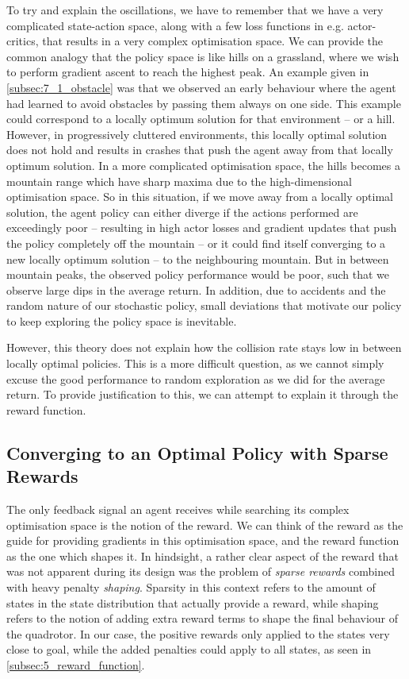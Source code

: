 To try and explain the oscillations, we have to remember that we have a very complicated state-action space, along with a few loss functions in e.g. actor-critics, that results in a very complex optimisation space. We can provide the common analogy that the policy space is like hills on a grassland, where we wish to perform gradient ascent to reach the highest peak. An example given in \cref{subsec:7_1_obstacle} was that we observed an early behaviour where the agent had learned to avoid obstacles by passing them always on one side. This example could correspond to a locally optimum solution for that environment -- or a hill.  
However, in progressively cluttered environments, this locally optimal solution does not hold and results in crashes that push the agent away from that locally optimum solution. In a more complicated optimisation space, the hills becomes a mountain range which have sharp maxima due to the high-dimensional optimisation space. So in this situation, if we move away from a locally optimal solution, the agent policy can either diverge if the actions performed are exceedingly poor -- resulting in high actor losses and gradient updates that push the policy completely off the mountain -- or it could find itself converging to a new locally optimum solution -- to the neighbouring mountain. But in between mountain peaks, the observed policy performance would be poor, such that we observe large dips in the average return. In addition, due to accidents and the random nature of our stochastic policy, small deviations that motivate our policy to keep exploring the policy space is inevitable.

However, this theory does not explain how the collision rate stays low in between locally optimal policies. This is a more difficult question, as we cannot simply excuse the good performance to random exploration as we did for the average return. To provide justification to this, we can attempt to explain it through the reward function.


\subsection{Converging to an Optimal Policy with Sparse Rewards}
\label{subsec:9_sparse_rewards}
The only feedback signal an agent receives while searching its complex optimisation space is the notion of the reward. We can think of the reward as the guide for providing gradients in this optimisation space, and the reward function as the one which shapes it. In hindsight, a rather clear aspect of the reward that was not apparent during its design was the problem of \textit{sparse rewards} combined with heavy penalty \textit{shaping}. Sparsity in this context refers to the amount of states in the state distribution that actually provide a reward, while shaping refers to the notion of adding extra reward terms to shape the final behaviour of the quadrotor.
In our case, the positive rewards only applied to the states very close to goal, while the added penalties could apply to all states, as seen in \cref{subsec:5_reward_function}.

